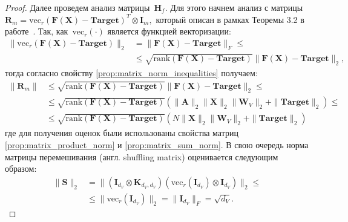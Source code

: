\begin{proof}
Далее проведем анализ матрицы~$\mathbf{H}_f$.
Для этого начнем анализ с матрицы~$\mathbf{R}_m = \mathrm{vec}_r (\mathbf{F} (\mathbf{X}) - \textbf{Target})^T \otimes \mathbf{I}_m,$ который описан в рамках Теоремы 3.2 в работе~\cite{ormaniec2024attentionhessian}.
Так, как~$\mathrm{vec}_r(\cdot)$ является функцией векторизации: 
\begin{align}
    \|\mathrm{vec}_r(\mathbf{F}(\mathbf{X}) - \textbf{Target})\|_2 &= \| \mathbf{F}(\mathbf{X}) - \textbf{Target} \|_F \leq\\
    &\leq\sqrt{\mathrm{rank}(\mathbf{F}(\mathbf{X}) - \textbf{Target} )} \| \mathbf{F}(\mathbf{X}) - \textbf{Target} \|_2,
\end{align}
тогда согласно свойству \ref{prop:matrix_norm_inequalities} получаем: 
\begin{align}
    \| \mathbf{R}_m\| &\leq \sqrt{\mathrm{rank}(\mathbf{F}(\mathbf{X}) - \textbf{Target})} \|\mathbf{F}(\mathbf{X}) - \textbf{Target}\|_2 \leq\\
    &\leq\sqrt{\mathrm{rank}(\mathbf{F}(\mathbf{X}) - \textbf{Target})} (\| \mathbf{A} \|_2 \|\mathbf{X}\|_2 \|\mathbf{W}_V \|_2 + \|\textbf{Target}\|_2) \leq\\
    &\leq \sqrt{\mathrm{rank}(\mathbf{F}(\mathbf{X}) - \textbf{Target})} (N \|\mathbf{X}\|_2 \|\mathbf{W}_V \|_2 + \|\textbf{Target}\|_2)
\end{align}
где для получения оценок были использованы свойства матриц \ref{prop:matrix_product_norm} и \ref{prop:matrix_sum_norm}. В свою очередь норма матрицы перемешивания (англ. shuffling matrix) оценивается следующим образом:
\begin{align}
    \| \mathbf{S}\|_2 &= \|(\mathbf{I}_{d_V} \otimes \mathbf{K}_{d_V,d_V}) (\mathrm{vec}_r (\mathbf{I}_{d_V}) \otimes \mathbf{I}_{d_V})\|_2 \leq \\
    &\leq \| \mathrm{vec}_r (\mathbf{I}_{d_V}) \|_2 = \| \mathbf{I}_{d_V}\|_{F} = \sqrt{d_V}.
\end{align}


\end{proof}
